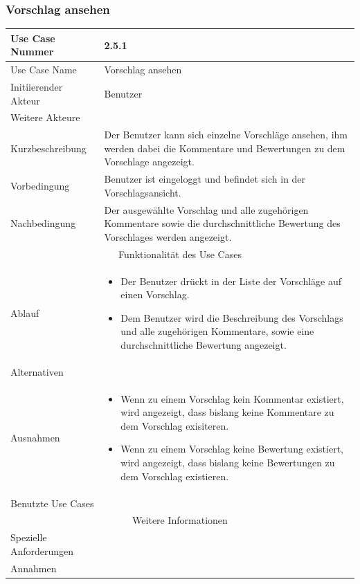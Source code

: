 \documentclass[10pt,a4paper]{article}
\begin{document}
\subsubsection{Vorschlag ansehen}
	\begin{tabular}{|l|p{.5\linewidth}|}
	\hline Use Case Nummer & 2.5.1 \\ 
	\hline Use Case Name & Vorschlag ansehen \\ 
	\hline Initiierender Akteur & Benutzer \\
	\hline Weitere Akteure &  \\
	\hline Kurzbeschreibung & Der Benutzer kann sich einzelne Vorschl\"age ansehen, ihm werden dabei die Kommentare und Bewertungen zu dem Vorschlage angezeigt. \\
	\hline Vorbedingung & Benutzer ist eingeloggt und befindet sich in der Vorschlagsansicht. \\
	\hline Nachbedingung & Der ausgewählte Vorschlag und alle zugehörigen Kommentare sowie die durchschnittliche Bewertung des Vorschlages werden angezeigt. \\
	\hline \multicolumn{2}{|c|}{Funktionalität des Use Cases}\\
	\hline Ablauf & \begin{itemize}
		\item Der Benutzer drückt in der Liste der Vorschläge auf einen Vorschlag.
		\item Dem Benutzer wird die Beschreibung des Vorschlags und alle zugehörigen Kommentare, sowie eine durchschnittliche Bewertung angezeigt.
	\end{itemize} \\
	\hline Alternativen &  \\
	\hline Ausnahmen & \begin{itemize}
        	\item Wenn zu einem Vorschlag kein Kommentar existiert, wird angezeigt, dass bislang keine Kommentare zu dem Vorschlag exisiteren.
                \item Wenn zu einem Vorschlag keine Bewertung existiert, wird angezeigt, dass bislang keine Bewertungen zu dem Vorschlag existieren. 
                \end{itemize} \\
	\hline Benutzte Use Cases &  \\
	\hline \multicolumn{2}{|c|}{Weitere Informationen} \\
	\hline Spezielle Anforderungen &  \\
	\hline Annahmen &  \\
	\hline
	\end{tabular}
\end{document}
